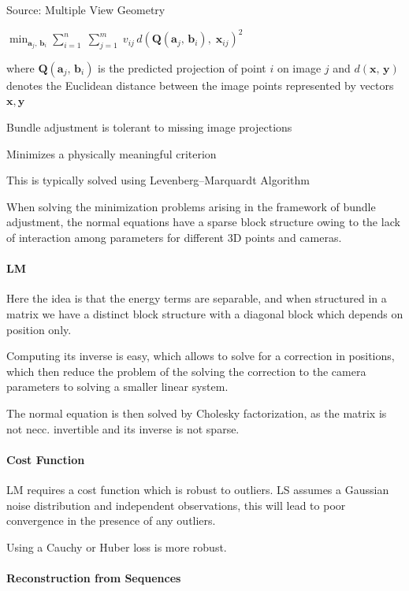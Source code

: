 Source: Multiple View Geometry



$\min _{{{\mathbf  {a}}_{j},\,{\mathbf  {b}}_{i}}}\displaystyle \sum _{{i=1}}^{{n}}\;\displaystyle \sum _{{j=1}}^{{m}}\;v_{{ij}}\,d({\mathbf  {Q}}({\mathbf  {a}}_{j},\,{\mathbf  {b}}_{i}),\;{\mathbf{x}}_{{ij}})^{2}$

where $\mathbf {Q} (\mathbf {a} _{j},\,\mathbf {b} _{i})$ is the predicted projection of point $i$ on image $j$ and $d(\mathbf {x} ,\,\mathbf {y} )$  denotes the Euclidean distance between the image points represented by vectors $\mathbf{x,y}$

Bundle adjustment is tolerant to missing image projections 

Minimizes a physically meaningful criterion

This is typically solved using Levenberg–Marquardt Algorithm

When solving the minimization problems arising in the framework of bundle adjustment, the normal equations have a sparse block structure owing to the lack of interaction among parameters for different 3D points and cameras.

\paragraph{LM}

Here the idea is that the energy terms are separable, and when structured in a matrix we have a distinct block structure with a diagonal block which depends on position only. 

Computing its inverse is easy, which allows to solve for a correction in positions, which then reduce the problem of the solving the correction to the camera parameters to solving a smaller linear system.

The normal equation is then solved by Cholesky factorization, as the matrix is not necc. invertible and its inverse is not sparse.

\paragraph{Cost Function}
LM requires a cost function which is robust to outliers. 
LS assumes a Gaussian noise distribution and independent observations, this will lead to poor convergence in the presence of any outliers. 

Using a Cauchy or Huber loss is more robust.

\paragraph{Reconstruction from Sequences}

